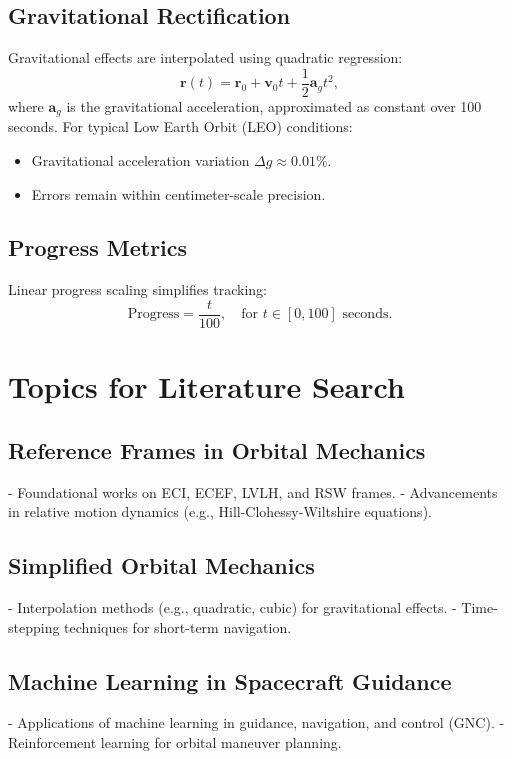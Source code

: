 \subsection{Gravitational Rectification}
Gravitational effects are interpolated using quadratic regression:
\[
\mathbf{r}(t) = \mathbf{r}_0 + \mathbf{v}_0 t + \frac{1}{2} \mathbf{a}_g t^2,
\]
where \(\mathbf{a}_g\) is the gravitational acceleration, approximated as constant over 100 seconds. For typical Low Earth Orbit (LEO) conditions:
\begin{itemize}
  \item Gravitational acceleration variation \(\Delta g \approx 0.01\%\).
  \item Errors remain within centimeter-scale precision.
\end{itemize}

\subsection{Progress Metrics}
Linear progress scaling simplifies tracking:
\[
\text{Progress} = \frac{t}{100}, \quad \text{for } t \in [0, 100] \text{ seconds}.
\]

\section{Topics for Literature Search}

\subsection{Reference Frames in Orbital Mechanics}
- Foundational works on ECI, ECEF, LVLH, and RSW frames.
- Advancements in relative motion dynamics (e.g., Hill-Clohessy-Wiltshire equations).

\subsection{Simplified Orbital Mechanics}
- Interpolation methods (e.g., quadratic, cubic) for gravitational effects.
- Time-stepping techniques for short-term navigation.

\subsection{Machine Learning in Spacecraft Guidance}
- Applications of machine learning in guidance, navigation, and control (GNC).
- Reinforcement learning for orbital maneuver planning.

